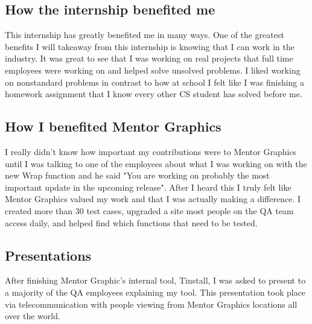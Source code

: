 \documentclass[letterpaper,10pt,notitlepage,fleqn]{article}
\begin{document}
\subsection{How the internship benefited me}
\indent This internship has greatly benefited me in many ways. One of the greatest 
benefits I will takeaway from this internship is knowing that I can work in the 
industry. It was great to see that I was working on real projects that full time 
employees were working on and helped solve unsolved problems. I liked working on 
nonstandard problems in contrast to how at school I felt like I was finishing 
a homework assignment that I know every other CS student has solved before me. 
\\
\subsection{How I benefited Mentor Graphics}
\indent I really didn't know how important my contributions were to Mentor Graphics until 
I was talking to  one of the employees about what I was working on with the new Wrap function and he said "You 
are working on probably the most important update in the upcoming release". After 
I heard this I truly felt like Mentor Graphics valued my work and that I was actually
making a difference. I created more than 30 test cases, upgraded a site most people 
on the QA team access daily, and helped find which functions that need to be tested.\\ 
\subsection{Presentations}
\indent After finishing Mentor Graphic's internal tool, Tinstall, I was asked to present to 
a majority of the QA employees explaining my tool. This presentation took place via 
telecommunication with people viewing from Mentor Graphics locations all over the 
world.
\end{document}
